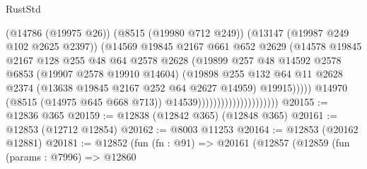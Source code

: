 \begin{lexlean}{RustStd}
\begin{coremodule}
                                                (@14786 (@19975 @26))
                                                (@8515 (@19980 @712 @249))
                                                (@13147 (@19987 @249 @102 @2625 @2397))
                                                (@14569
                                                  @19845
                                                  @2167
                                                  @661
                                                  @652
                                                  @2629
                                                  (@14578
                                                    @19845
                                                    @2167
                                                    @128
                                                    @255
                                                    @48
                                                    @64
                                                    @2578
                                                    @2628
                                                    (@19899
                                                      @257
                                                      @48
                                                      @14592
                                                      @2578
                                                      @6853
                                                      (@19907 @2578 @19910 @14604)
                                                      (@19898
                                                        @255
                                                        @132
                                                        @64
                                                        @11
                                                        @2628
                                                        @2374
                                                        (@13638 @19845 @2167 @252 @64 @2627 @14959)
                                                        @19915)))))
                                              @14970
                                              (@8515 (@14975 @645 @668 @713))
                                              @14539)))))))))))))))))))))
@20155 := @12836 @365
@20159 := @12838 (@12842 @365) (@12848 @365)
@20161 := @12853 (@12712 @12854)
@20162 := @8003 @11253
@20164 := @12853 (@20162 @12881)
@20181 := @12852
    (fun (fn : @91) =>
    @20161
      (@12857
        (@12859
          (fun (params : @7996) =>
          @12860

\end{coremodule}
\end{lexlean}
